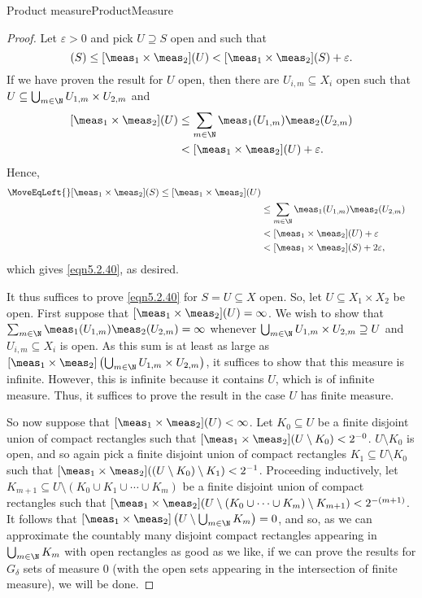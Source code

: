 \begin{thm}{Product measure}{ProductMeasure}
\begin{proof}
Let $\varepsilon >0$ and pick $U\supseteq S$ open and such that
\begin{equation}
[\meas _1\times \meas _2](S)\leq [\meas _1\times \meas _2](U)<[\meas _1\times \meas _2](S)+\varepsilon .
\end{equation}
If we have proven the result for $U$ open, then there are $U_{i,m}\subseteq X_i$ open such that $U\subseteq \bigcup _{m\in \N}U_{1,m}\times U_{2,m}$ and
\begin{equation}
\begin{split}
[\meas _1\times \meas _2](U) & \leq \sum _{m\in \N}\meas _1(U_{1,m})\meas _2(U_{2,m}) \\
& <[\meas _1\times \meas _2](U)+\varepsilon .
\end{split}
\end{equation}
Hence,
\begin{equation}
\begin{split}
\MoveEqLeft {}
[\meas _1\times \meas _2](S)\leq [\meas _1\times \meas _2](U) \\
& \leq \sum _{m\in \N}\meas _1(U_{1,m})\meas _2(U_{2,m}) \\
& <[\meas _1\times \meas _2](U)+\varepsilon \\
& <[\meas _1\times \meas _2](S)+2\varepsilon ,
\end{split}
\end{equation}
which gives \eqref{eqn5.2.40}, as desired.

It thus suffices to prove \eqref{eqn5.2.40} for $S=U\subseteq X$ open.  So, let $U\subseteq X_1\times X_2$ be open.  First suppose that $[\meas _1\times \meas _2](U)=\infty$.  We wish to show that $\sum _{m\in \N}\meas _1(U_{1,m})\meas _2(U_{2,m})=\infty$ whenever $\bigcup _{m\in \N}U_{1,m}\times U_{2,m}\supseteq U$ and $U_{i,m}\subseteq X_i$ is open.  As this sum is at least as large as $[\meas _1\times \meas _2]\left( \bigcup _{m\in \N}U_{1,m}\times U_{2,m}\right)$, it suffices to show that this measure is infinite.  However, this is infinite because it contains $U$, which is of infinite measure.  Thus, it suffices to prove the result in the case $U$ has finite measure.

So now suppose that $[\meas _1\times \meas _2](U)<\infty$.  Let $K_0\subseteq U$ be a finite disjoint union of compact rectangles such that $[\meas _1\times \meas _2](U\setminus K_0)<2^{-0}$.  $U\setminus K_0$ is open, and so again pick a finite disjoint union of compact rectangles $K_1\subseteq U\setminus K_0$ such that $[\meas _1\times \meas _2]((U\setminus K_0)\setminus K_1)<2^{-1}$.  Proceeding inductively, let $K_{m+1}\subseteq U\setminus (K_0\cup K_1\cup \cdots \cup K_m)$ be a finite disjoint union of compact rectangles such that $[\meas _1\times \meas _2](U\setminus (K_0\cup \cdots \cup K_m)\setminus K_{m+1})<2^{-(m+1)}$.  It follows that $[\meas _1\times \meas _2]\left( U\setminus \bigcup _{m\in \N}K_m\right) =0$, and so, as we can approximate the countably many disjoint compact rectangles appearing in $\bigcup _{m\in \N}K_m$ with open rectangles as good as we like, if we can prove the results for $G_{\delta}$ sets of measure $0$ (with the open sets appearing in the intersection of finite measure), we will be done.


\end{proof}
\end{thm}
